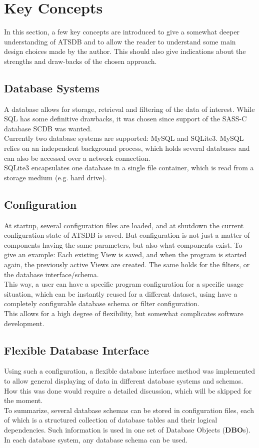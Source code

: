 \chapter{Key Concepts}
\label{sec:key_concepts}

In this section, a few key concepts are introduced to give a somewhat deeper understanding of ATSDB and to allow the reader to understand some main design choices made by the author. This should also give indications about the strengths and draw-backs of the chosen approach.

\section*{Database Systems}
A database allows for storage, retrieval and filtering of the data of interest. While SQL has some definitive drawbacks, it was chosen since support of the SASS-C database SCDB was wanted.\\
Currently  two  database  systems  are  supported:  MySQL  and  SQLite3.   MySQL  relies  on  an  independent background process, which holds several databases and can also be accessed over a network connection.\\
SQLite3 encapsulates one database in a single file container, which is read from a storage medium (e.g. hard drive).

\section*{Configuration}
At startup, several configuration files are loaded, and at shutdown the current configuration state of ATSDB is saved.  But configuration is not just a matter of components having the same parameters, but also what components exist. To give an example: Each existing View is saved, and when the program is started again, the previously active Views are created.  The same holds for the filters, or the database interface/schema. \\
This way, a user can have a specific program configuration for a specific usage situation, which can be instantly reused for a different dataset, using have a completely configurable database schema or filter configuration. \\
This allows for a high degree of flexibility, but somewhat complicates software development.

\section*{Flexible Database Interface}
Using such a configuration, a flexible database interface method was implemented to allow general displaying of data in different database systems and schemas.  How this was done would require a detailed discussion, which will be skipped for the moment.\\
To summarize, several database schemas can be stored in configuration files, each of which is a structured collection of database tables and their logical dependencies. Such information is used in one set of Database Objects (\textbf{DBO}s). In each database system, any database schema can be used.

